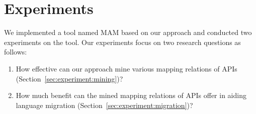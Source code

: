 



\section{Experiments}
\label{sec:experiment} We implemented a tool named MAM based on our
approach and conducted two experiments on the tool. Our experiments
focus on two research questions as follows:
\vspace*{-1.5ex}\begin{enumerate}
\item How effective can our approach mine various mapping relations of APIs
(Section~\ref{sec:experiment:mining})? \vspace*{-1.5ex}
\item How much benefit can the mined mapping relations of APIs offer in aiding language
migration (Section~\ref{sec:experiment:migration})?\vspace*{-1.5ex}
\end{enumerate}%
